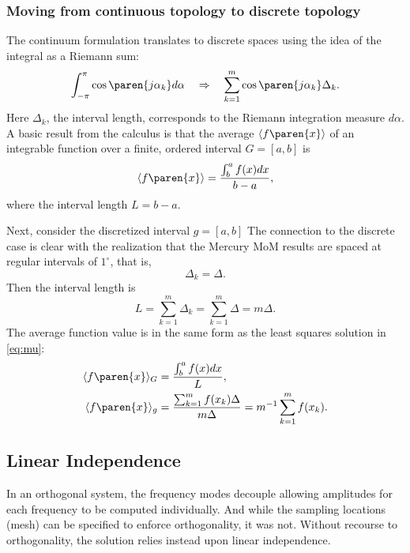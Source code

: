 \subsubsection{Moving from continuous topology to discrete topology}
The continuum formulation translates to discrete spaces using the idea of the integral as a Riemann sum: 
\begin{equation}
	\int_{-\pi}^{\pi}{ \cos \paren{j\alpha_{k}} d\alpha } \quad \Rightarrow \quad \sum_{k=1}^{m} \cos \paren{j\alpha_{k}} \Delta_{k}.
\end{equation}
Here $\Delta_{k}$, the interval length, corresponds to the Riemann integration measure $d\alpha$. A basic result from the calculus is that the average $\langle f\paren{x} \rangle$ of an integrable function over a finite, ordered interval $G=[a,b]$ is
\begin{equation}
	\langle f\paren{x} \rangle = \frac{\int_{b}^{a} f(x) dx }{b-a},
\end{equation}
where the interval length $L=b-a$. 

Next, consider the discretized interval $g=[a, b]$
The connection to the discrete case is clear with the realization that the Mercury MoM results are spaced at regular intervals of $1^{\circ}$, that is,
$$ \Delta_{k} = \Delta.$$ 
Then the interval length is
\begin{equation}
	L = \sum_{k=1}^{m} \Delta_{k} = \sum_{k=1}^{m}  \Delta = m \Delta.
\end{equation}
The average function value is in the same form as the least squares solution in \eqref{eq:mu}:
\begin{equation}
	\begin{split}
		\langle f\paren{x} \rangle_{G} &= \frac{\int_{b}^{a} f(x) dx }{L} ,\\
		\langle f\paren{x} \rangle_{g} &= \frac{\sum_{k=1}^{m} f(x_{k}) \Delta}{m \Delta} =  m^{-1} \sum_{k=1}^{m} f(x_{k}) .
	\end{split}
\end{equation}

\subsection{Linear Independence}
In an orthogonal system, the frequency modes decouple allowing amplitudes for each frequency to be computed individually. And while the sampling locations (mesh) can be specified to enforce orthogonality, it was not. Without recourse to orthogonality, the solution relies instead upon linear independence. 


